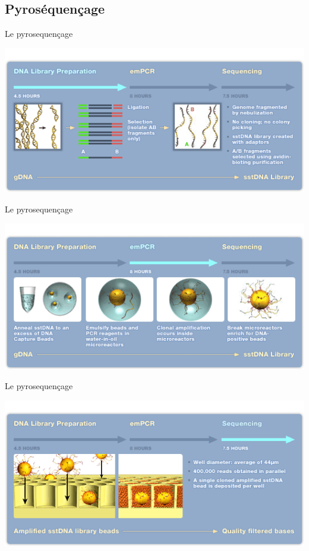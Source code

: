 \documentclass[12pt]{beamer}
\begin{document}
\subsection{Pyroséquençage}
\begin{frame}{Le pyrosequençage}
\begin{center}
\includegraphics[scale=0.6]{./img/seq1.png}
\end{center}
\end{frame}


\begin{frame}{Le pyrosequençage}
\begin{center}
\includegraphics[scale=0.6]{./img/microbille.png}
\end{center}
\end{frame}


\begin{frame}{Le pyrosequençage}
\begin{center}
\includegraphics[scale=0.6]{./img/incbil.png}
\end{center}
\end{frame}
\end{document}
